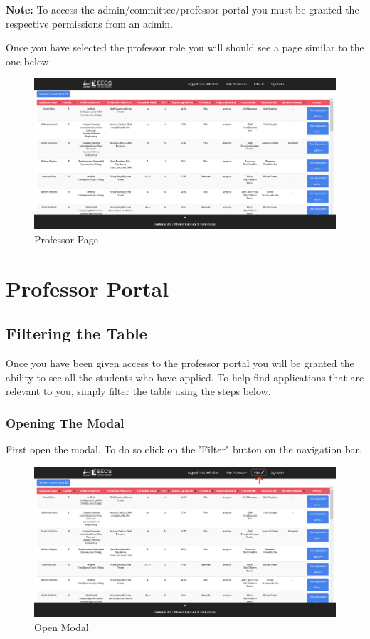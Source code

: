 \documentclass[fontsize=12pt,paper=letter,twoside]{scrartcl}
\begin{document}
\noindent \textbf{Note:} To access the admin/committee/professor portal you must be granted the respective permissions from an admin.

\clearpage

Once you have selected the professor role you will should see a page similar to the one below

\begin{figure}[!htb]
\begin{center}
\includegraphics[width=.99\textwidth]{images/professor.png}
\end{center}
\caption{Professor Page}
\label{fig:professor}
\end{figure}

\clearpage
\section{Professor Portal}
\subsection{Filtering the Table}
Once you have been given access to the professor portal you will be granted the ability to see all the students who have applied. To help find applications that are relevant to you, simply filter the table using the steps below.

\subsubsection{Opening The Modal}
First open the modal. To do so click on the 'Filter" button on the navigation bar.

\begin{figure}[!htb]
\begin{center}
\includegraphics[width=.99\textwidth]{images/open_modal.png}
\end{center}
\caption{Open Modal}
\label{fig:open_modal}
\end{figure}
\end{document}
